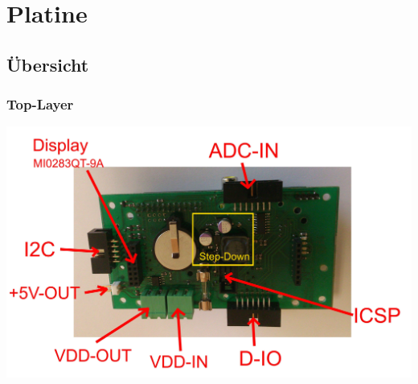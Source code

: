 \documentclass[a4paper,10pt]{article}
\begin{document}


\newpage
\section{Platine}

\subsection{Übersicht}

\subsubsection{Top-Layer}

\includegraphics[width=\textwidth]{pointhiboard_overview_top}
\end{document}
